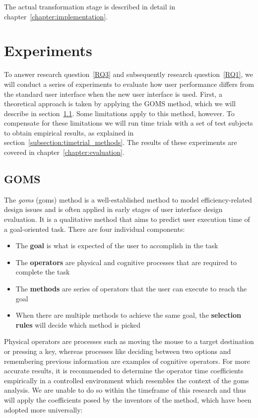 The actual transformation stage is described in detail in chapter~\ref{chapter:implementation}.

\section{Experiments}
\label{section:experiments_methods}
To answer research question~\ref{RQ3} and subsequently research question~\ref{RQ1}, we will conduct a series of experiments to evaluate how user performance differs from the standard user interface when the new user interface is used. First, a theoretical approach is taken by applying the GOMS method, which we will describe in section~\ref{subsection:goms_methods}. Some limitations apply to this method, however. To compensate for these limitations we will run time trials with a set of test subjects to obtain empirical results, as explained in section~\ref{subsection:timetrial_methods}. The results of these experiments are covered in chapter~\ref{chapter:evaluation}.

\subsection{GOMS}
\label{subsection:goms_methods}
The \textit{\acrlong{goms}} (\acrshort{goms}) method is a well-established method to model efficiency-related design issues and is often applied in early stages of user interface design evaluation\cite{schrepp1990goms, john1996goms, kieras1994goms}. It is a qualitative method that aims to predict user execution time of a goal-oriented task. There are four individual components:

\begin{itemize}
	\item The \textbf{goal} is what is expected of the user to accomplish in the task
	\item The \textbf{operators} are physical and cognitive processes that are required to complete the task
	\item The \textbf{methods} are series of operators that the user can execute to reach the goal
	\item When there are multiple methods to achieve the same goal, the \textbf{selection rules} will decide which method is picked
\end{itemize}

Physical operators are processes such as moving the mouse to a target destination or pressing a key, whereas processes like deciding between two options and remembering previous information are examples of cognitive operators. For more accurate results, it is recommended to determine the operator time coefficients empirically in a controlled environment which resembles the context of the \acrshort{goms} analysis\cite{gong1994validation}. We are unable to do so within the timeframe of this research and thus will apply the coefficients posed by the inventors of the method, which have been adopted more universally\cite{kieras2001using}:


